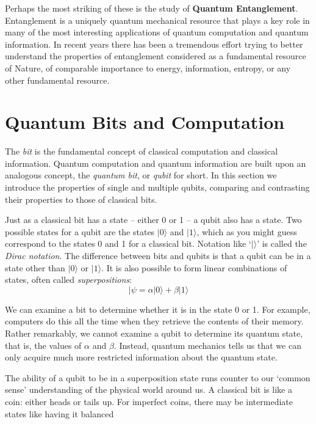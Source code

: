 \documentclass[20pt]{report}
\begin{document}
\par
Perhaps the most striking of these is the study of \textbf{Quantum Entanglement}. Entanglement is a uniquely quantum mechanical resource that plays a key role in many of the most interesting applications of quantum computation and quantum information. In recent years there has been a tremendous effort trying to better understand the properties of entanglement considered as a fundamental resource of Nature, of comparable importance to energy, information, entropy, or any other fundamental resource.

\part{Quantum Bits and Computation}
The \textit{bit} is the fundamental concept of classical computation and classical information.
Quantum computation and quantum information are built upon an analogous concept,
the \textit{quantum bit}, or \textit{qubit} for short. In this section we introduce the properties of single
and multiple qubits, comparing and contrasting their properties to those of classical bits.
\par
Just as a classical bit has a state – either 0 or 1 – a qubit also
has a state. Two possible states for a qubit are the states $|0\rangle$ and $|1\rangle$, which as you might
guess correspond to the states 0 and 1 for a classical bit. Notation like ‘$| \rangle$’ is called the
\textit{Dirac notation}.  The difference between bits and qubits is that a qubit can be in a
state other than $|0\rangle $ or $|1\rangle$. It is also possible to form linear combinations of states, often
called \textit{superpositions}: 
\begin{equation}
|\psi = \alpha|0\rangle + \beta|1\rangle
\end{equation}
\par
We can examine a bit to determine whether it is in the state 0 or 1. For example,
computers do this all the time when they retrieve the contents of their memory. Rather
remarkably, we cannot examine a qubit to determine its quantum state, that is, the
values of $\alpha$ and $\beta$. Instead, quantum mechanics tells us that we can only acquire much more restricted information about the quantum state.
\par
The ability of a qubit to be in a superposition state runs counter to our ‘common sense’
understanding of the physical world around us. A classical bit is like a coin: either heads
or tails up. For imperfect coins, there may be intermediate states like having it balanced
\end{document}
